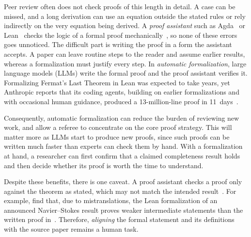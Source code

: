\documentclass[acmsmall,screen,nonacm]{acmart}
\begin{document}
Peer review often does not check proofs of this length in detail. A case can be missed, and a long derivation can use an equation outside the stated rules or rely indirectly on the very equation being derived. A \emph{proof assistant} such as Agda~\cite{norell2007thesis,bove2009agda} or Lean~\cite{moura2015lean,moura2021lean4} checks the logic of a formal proof mechanically~\cite{barendregt2005challenge,hales2008formalproof,geuvers2009proofassistants,avigad2014formally}, so none of these errors goes unnoticed. The difficult part is writing the proof in a form the assistant accepts. A paper can leave routine steps to the reader and assume earlier results, whereas a formalization must justify every step. In \emph{automatic formalization}, large language models (LLMs) write the formal proof and the proof assistant verifies it. Formalizing Fermat's Last Theorem in Lean was expected to take years, yet Anthropic reports that its coding agents, building on earlier formalizations and with occasional human guidance, produced a 13-million-line proof in 11~days~\cite{anthropic2026flt}.

Consequently, automatic formalization can reduce the burden of reviewing new work, and allow a referee to concentrate on the core proof strategy. This will matter more as LLMs start to produce new proofs, since such proofs can be written much faster than experts can check them by hand. With a formalization at hand, a researcher can first confirm that a claimed completeness result holds and then decide whether its proof is worth the time to understand.

Despite these benefits, there is one caveat. A proof assistant checks a proof only against the theorem as stated, which may not match the intended
result~\cite{hales2026reliability}. For example, \citet{bastounis2026navier} find that, due to mistranslations, the Lean formalization of an
announced Navier--Stokes result proves weaker intermediate statements than the written proof in~\cite{openai2026navierstokes}. Therefore, \emph{aligning} the formal statement and its definitions with the source paper remains a human task.
\end{document}
